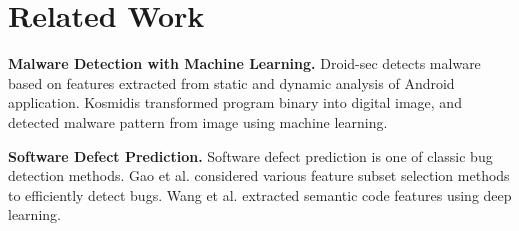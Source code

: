 \section{Related Work}
\label{section:related}

\textbf{Malware Detection with Machine Learning.}
Droid-sec \cite{yuan2014droid} detects malware based on features extracted from static and dynamic analysis of Android application.
Kosmidis \cite{kosmidis2017machine} transformed program binary into digital image, and detected malware pattern from image using machine learning.

\textbf{Software Defect Prediction.}
Software defect prediction \cite{khoshgoftaar2009attribute, lessmann2008benchmarking} is one of classic bug detection methods.
Gao et al. \cite{gao2011choosing} considered various feature subset selection methods to efficiently detect bugs.
Wang et al. \cite{wang2016automatically} extracted semantic code features using deep learning.